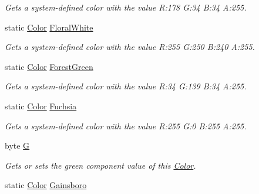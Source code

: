 \begin{DoxyCompactItemize}
\begin{DoxyCompactList}\small\item\em Gets a system-\/defined color with the value R\+:178 G\+:34 B\+:34 A\+:255.\end{DoxyCompactList}\item 
static \hyperlink{structMicrosoft_1_1Xna_1_1Framework_1_1Color}{Color} \hyperlink{structMicrosoft_1_1Xna_1_1Framework_1_1Color_a971eba50d5756242cd07c54c6ff5cb89}{Floral\+White}
\begin{DoxyCompactList}\small\item\em Gets a system-\/defined color with the value R\+:255 G\+:250 B\+:240 A\+:255.\end{DoxyCompactList}\item 
static \hyperlink{structMicrosoft_1_1Xna_1_1Framework_1_1Color}{Color} \hyperlink{structMicrosoft_1_1Xna_1_1Framework_1_1Color_a61f5d4fc4b86bf1071dd413d8cec0810}{Forest\+Green}
\begin{DoxyCompactList}\small\item\em Gets a system-\/defined color with the value R\+:34 G\+:139 B\+:34 A\+:255.\end{DoxyCompactList}\item 
static \hyperlink{structMicrosoft_1_1Xna_1_1Framework_1_1Color}{Color} \hyperlink{structMicrosoft_1_1Xna_1_1Framework_1_1Color_a747de302c829d0e557d262945474d126}{Fuchsia}
\begin{DoxyCompactList}\small\item\em Gets a system-\/defined color with the value R\+:255 G\+:0 B\+:255 A\+:255.\end{DoxyCompactList}\item 
byte \hyperlink{structMicrosoft_1_1Xna_1_1Framework_1_1Color_ad42e5b4daa26324d6319b4b360dd9afb}{G}
\begin{DoxyCompactList}\small\item\em Gets or sets the green component value of this \hyperlink{structMicrosoft_1_1Xna_1_1Framework_1_1Color}{Color}.\end{DoxyCompactList}\item 
static \hyperlink{structMicrosoft_1_1Xna_1_1Framework_1_1Color}{Color} \hyperlink{structMicrosoft_1_1Xna_1_1Framework_1_1Color_aea07c873be1d8107ef6186af9a3f92ba}{Gainsboro}

\end{DoxyCompactItemize}
